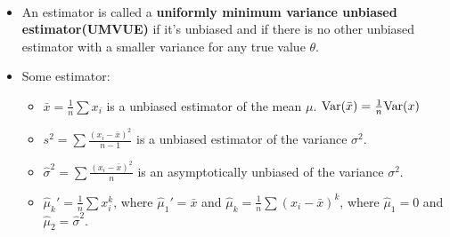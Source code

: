\documentclass[10pt, french]{article}
\begin{document}
\begin{multicols*}{3}
\begin{itemize}[align=left,leftmargin=*]
\begin{align*}
    \end{align*}
    \item An estimator is called a \textbf{uniformly minimum variance unbiased estimator(UMVUE)} if it's unbiased and if there is no other unbiased estimator with a smaller variance for any true value $\theta$.
    \item Some estimator:
    \begin{itemize}
        \item $\bar{x}=\frac{1}{n}\sum x_i$ is a unbiased estimator of the mean $\mu$. $\mathrm{Var} {\left( \bar{x} \right)}=\frac{1}{n}\mathrm{Var} {\left( x \right)}$
        \item $s^2=\sum \frac{(x_i-\bar{x})^2}{n-1}$ is a unbiased estimator of the variance $\sigma^2$.
        \item $\hat{\sigma}^2=\sum \frac{(x_i-\bar{x})^2}{n}$ is an asymptotically unbiased of the variance $\sigma^2$.
        \item $\hat{\mu}_k'=\frac{1}{n}\sum x_i^k$, where $\hat{\mu}_1'=\bar{x}$ and $\hat{\mu}_k=\frac{1}{n}\sum (x_i - \bar{x})^k$, where $\hat{\mu}_1=0$ and $\hat{\mu}_2=\hat{\sigma}^2$.
    \end{itemize}
\end{itemize}


\end{multicols*}
\end{document}
